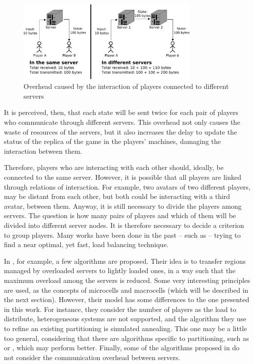 \begin{figure}
 \centering
 \includegraphics[width=0.8\textwidth]{images/overheadgeneration}
 \caption{Overhead caused by the interaction of players connected to different servers}
 \label{fig:overheadgeneration}
\end{figure}

It is perceived, then, that each state will be sent twice for each pair of players who communicate through different servers. This overhead not only causes the waste of resources of the servers, but it also increases the delay to update the status of the replica of the game in the players' machines, damaging the interaction between them.
	
Therefore, players who are interacting with each other should, ideally, be connected to the same server. However, it is possible that all players are linked through relations of interaction. For example, two avatars of two different players, may be distant from each other, but both could be interacting with a third avatar, between them. Anyway, it is still necessary to divide the players among servers. The question is how many pairs of players and which of them will be divided into different server nodes. It is therefore necessary to decide a criterion to group players. Many works have been done in the past -- such as \cite{devleeschauwer2005dma,lu2006lbm,chen2005lad,duong2003dls,ahmed2008mol} --  trying to find a near optimal, yet fast, load balancing technique.

In \cite{devleeschauwer2005dma}, for example, a few algorithms are proposed. Their idea is to transfer regions managed by overloaded servers to  lightly loaded ones, in a way such that the maximum overload among the servers is reduced. Some very interesting principles are used, as the concepts of microcells and macrocells (which will be described in the next section). However, their model has some differences to the one presented in this work. For instance, they consider the number of players as the load to distribute, heterogeneous systems are not supported, and the algorithm they use to refine an existing partitioning is simulated annealing. This one may be a little too general, considering that there are algorithms specific to partitioning, such as \cite{kernighan1970ehp} or \cite{fiduccia1982lth}, which may perform better. Finally, some of the algorithms proposed in \cite{devleeschauwer2005dma} do not consider the communication overhead between servers.


